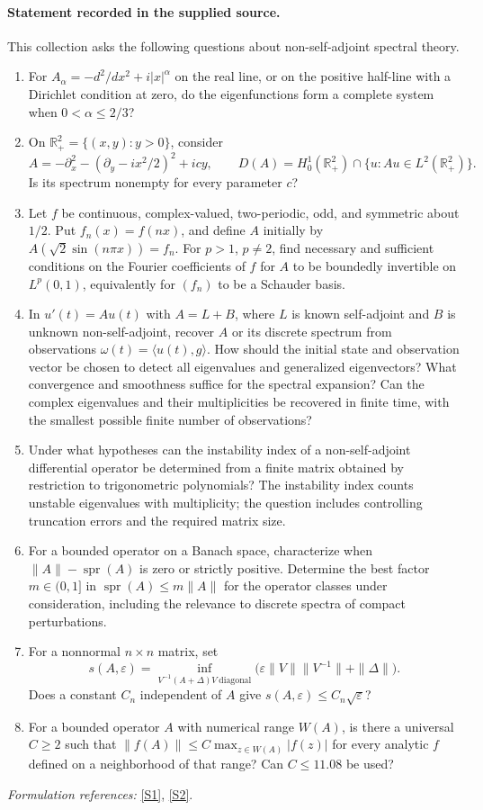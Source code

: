 \documentclass[11pt]{article}
\newcommand{\sref}[2]{\hyperlink{source:#1:#2}{[S#2]}}
\begin{document}
\paragraph{Statement recorded in the supplied source.}
This collection asks the following questions about non-self-adjoint spectral theory.
\begin{enumerate}
\item For $A_\alpha=-d^2/dx^2+i|x|^\alpha$ on the real line, or on the positive half-line with a Dirichlet condition at zero, do the eigenfunctions form a complete system when $0<\alpha\leq2/3$?
\item On $\mathbb R^2_+=\{(x,y):y>0\}$, consider
\[A=-\partial_x^2-(\partial_y-ix^2/2)^2+icy,\qquad D(A)=H^1_0(\mathbb R^2_+)\cap\{u:Au\in L^2(\mathbb R^2_+)\}.\]
Is its spectrum nonempty for every parameter $c$?
\item Let $f$ be continuous, complex-valued, two-periodic, odd, and symmetric about $1/2$. Put $f_n(x)=f(nx)$, and define $A$ initially by $A(\sqrt2\sin(n\pi x))=f_n$. For $p>1$, $p\neq2$, find necessary and sufficient conditions on the Fourier coefficients of $f$ for $A$ to be boundedly invertible on $L^p(0,1)$, equivalently for $(f_n)$ to be a Schauder basis.
\item In $u'(t)=Au(t)$ with $A=L+B$, where $L$ is known self-adjoint and $B$ is unknown non-self-adjoint, recover $A$ or its discrete spectrum from observations $\omega(t)=\langle u(t),g\rangle$. How should the initial state and observation vector be chosen to detect all eigenvalues and generalized eigenvectors? What convergence and smoothness suffice for the spectral expansion? Can the complex eigenvalues and their multiplicities be recovered in finite time, with the smallest possible finite number of observations?
\item Under what hypotheses can the instability index of a non-self-adjoint differential operator be determined from a finite matrix obtained by restriction to trigonometric polynomials? The instability index counts unstable eigenvalues with multiplicity; the question includes controlling truncation errors and the required matrix size.
\item For a bounded operator on a Banach space, characterize when $\|A\|-\operatorname{spr}(A)$ is zero or strictly positive. Determine the best factor $m\in(0,1]$ in $\operatorname{spr}(A)\leq m\|A\|$ for the operator classes under consideration, including the relevance to discrete spectra of compact perturbations.
\item For a nonnormal $n\times n$ matrix, set
\[s(A,\varepsilon)=\inf_{V^{-1}(A+\Delta)V\ \mathrm{diagonal}}\bigl(\varepsilon\|V\|\|V^{-1}\|+\|\Delta\|\bigr).\]
Does a constant $C_n$ independent of $A$ give $s(A,\varepsilon)\leq C_n\sqrt\varepsilon$?
\item For a bounded operator $A$ with numerical range $W(A)$, is there a universal $C\geq2$ such that $\|f(A)\|\leq C\max_{z\in W(A)}|f(z)|$ for every analytic $f$ defined on a neighborhood of that range? Can $C\leq11.08$ be used?
\end{enumerate}
\par\smallskip\textit{Formulation references:} \sref{20002498}{1}, \sref{20002498}{2}.
\end{document}
